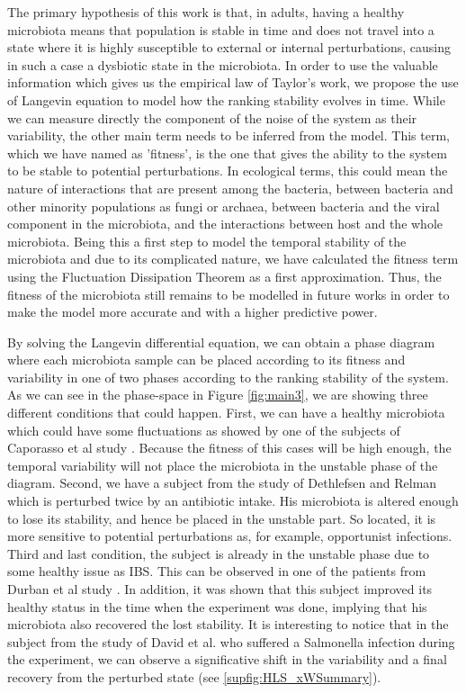 The primary hypothesis of this work is that, in adults, having a healthy microbiota means that population is stable in time and does not travel into a state where it is highly susceptible to external or internal perturbations, causing in such a case a dysbiotic state in the microbiota. In order to use the valuable information which gives us the empirical law of Taylor's work, we propose the use of Langevin equation to model how the ranking stability evolves in time. While we can measure directly the component of the noise of the system as their variability, the other main term needs to be inferred from the model. This term, which we have named as 'fitness', is the one that gives the ability to the system to be stable to potential perturbations. In ecological terms, this could mean the nature of interactions that are present among the bacteria, between bacteria and other minority populations as fungi or archaea, between bacteria and the viral component in the microbiota, and the interactions between host and the whole microbiota. Being this a first step to model the temporal stability of the microbiota and due to its complicated nature, we have calculated the fitness term using the Fluctuation Dissipation Theorem as a first approximation\cite{FD}. Thus, the fitness of the microbiota still remains to be modelled in future works in order to make the model more accurate and with a higher predictive power. 

By solving the Langevin differential equation, we can obtain a phase diagram where each microbiota sample can be placed according to its fitness and variability in one of two phases according to the ranking stability of the system. As we can see in the phase-space in Figure \ref{fig:main3}, we are showing three different conditions that could happen. First, we can have a healthy microbiota which could have some fluctuations as showed by one of the subjects of Caporasso et al study \cite{moving}. Because the fitness of this cases will be high enough, the temporal variability will not place the microbiota in the unstable phase of the diagram. Second, we have a subject from the study of Dethlefsen and Relman \cite{antibiotic} which is perturbed twice by an antibiotic intake. His microbiota is altered enough to lose its stability, and hence be placed in the unstable part. So located, it is more sensitive to potential perturbations as, for example, opportunist infections. Third and last condition, the subject is already in the unstable phase due to some healthy issue as IBS. This can be observed in one of the patients from Durban et al study \cite{IBS}. In addition, it was shown that this subject improved its healthy status in the time when the experiment was done, implying that his microbiota also recovered the lost stability. It is interesting to notice that in the subject from the study of David et al. \cite{hostlife} who suffered a Salmonella infection during the experiment, we can observe a significative shift in the variability and a final recovery from the perturbed state (see \ref{supfig:HLS_xWSummary}).


